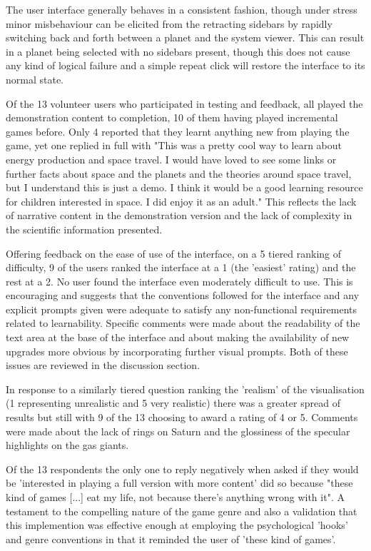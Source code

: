 \documentclass[twoside]{bhamthesis}
\begin{document}
The user interface generally behaves in a consistent fashion, though under stress minor misbehaviour can be elicited from the retracting sidebars by rapidly switching back and forth between a planet and the system viewer. This can result in a planet being selected with no sidebars present, though this does not cause any kind of logical failure and a simple repeat click will restore the interface to its normal state.

Of the 13 volunteer users who participated in testing and feedback, all played the demonstration content to completion, 10 of them having played incremental games before. Only 4 reported that they learnt anything new from playing the game, yet one replied in full with "This was a pretty cool way to learn about energy production and space travel. I would have loved to see some links or further facts about space and the planets and the theories around space travel, but I understand this is just a demo. I think it would be a good learning resource for children interested in space. I did enjoy it as an adult." This reflects the lack of narrative content in the demonstration version and the lack of complexity in the scientific information presented.

Offering feedback on the ease of use of the interface, on a 5 tiered ranking of difficulty, 9 of the users ranked the interface at a 1 (the 'easiest' rating) and the rest at a 2. No user found the interface even moderately difficult to use. This is encouraging and suggests that the conventions followed for the interface and any explicit prompts given were adequate to satisfy any non-functional requirements related to learnability. Specific comments were made about the readability of the text area at the base of the interface and about making the availability of new upgrades more obvious by incorporating further visual prompts. Both of these issues are reviewed in the discussion section.

In response to a similarly tiered question ranking the 'realism' of the visualisation (1 representing unrealistic and 5 very realistic) there was a greater spread of results but still with 9 of the 13 choosing to award a rating of 4 or 5. Comments were made about the lack of rings on Saturn and the glossiness of the specular highlights on the gas giants.

Of the 13 respondents the only one to reply negatively when asked if they would be 'interested in playing a full version with more content' did so because "these kind of games [...] eat my life, not because there's anything wrong with it". A testament to the compelling nature of the game genre and also a validation that this implemention was effective enough at employing the psychological 'hooks' and genre conventions in that it reminded the user of 'these kind of games'.
\end{document}
